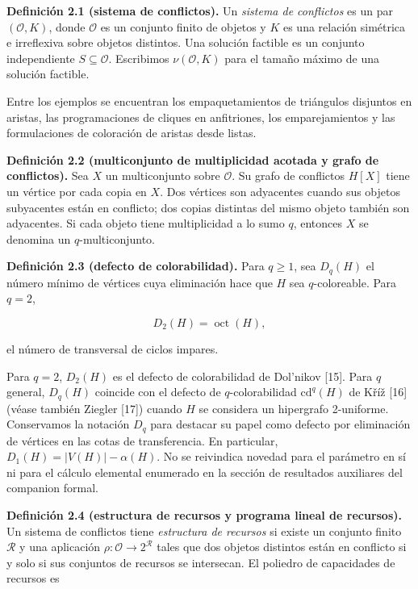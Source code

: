 \documentclass[spanish,11pt,a4paper]{article}
\begin{document}
\textbf{Definición 2.1 (sistema de conflictos).} Un \emph{sistema de
conflictos} es un par \((\mathcal O,K)\), donde \(\mathcal O\) es un
conjunto finito de objetos y \(K\) es una relación simétrica e
irreflexiva sobre objetos distintos. Una solución factible es un
conjunto independiente \(S\subseteq\mathcal O\). Escribimos
\(\nu(\mathcal O,K)\) para el tamaño máximo de una solución factible.

Entre los ejemplos se encuentran los empaquetamientos de triángulos
disjuntos en aristas, las programaciones de cliques en anfitriones, los
emparejamientos y las formulaciones de coloración de aristas desde
listas.

\textbf{Definición 2.2 (multiconjunto de multiplicidad acotada y grafo
de conflictos).} Sea \(X\) un multiconjunto sobre \(\mathcal O\). Su
grafo de conflictos \(H[X]\) tiene un vértice por cada copia en \(X\).
Dos vértices son adyacentes cuando sus objetos subyacentes están en
conflicto; dos copias distintas del mismo objeto también son adyacentes.
Si cada objeto tiene multiplicidad a lo sumo \(q\), entonces \(X\) se
denomina un \(q\)-multiconjunto.

\textbf{Definición 2.3 (defecto de colorabilidad).} Para \(q\ge1\), sea
\(D_q(H)\) el número mínimo de vértices cuya eliminación hace que \(H\)
sea \(q\)-coloreable. Para \(q=2\),

\[
D_2(H)=\operatorname{oct}(H),
\]

el número de transversal de ciclos impares.

Para \(q=2\), \(D_2(H)\) es el defecto de colorabilidad de Dol'nikov
{[}15{]}. Para \(q\) general, \(D_q(H)\) coincide con el defecto de
\(q\)-colorabilidad \(\mathrm{cd}^q(H)\) de Kříž {[}16{]} (véase también
Ziegler {[}17{]}) cuando \(H\) se considera un hipergrafo 2-uniforme.
Conservamos la notación \(D_q\) para destacar su papel como defecto por
eliminación de vértices en las cotas de transferencia. En particular,
\(D_1(H)=|V(H)|-\alpha(H)\). No se reivindica novedad para el parámetro
en sí ni para el cálculo elemental enumerado en la sección de resultados
auxiliares del companion formal.

\textbf{Definición 2.4 (estructura de recursos y programa lineal de
recursos).} Un sistema de conflictos tiene \emph{estructura de recursos}
si existe un conjunto finito \(\mathcal R\) y una aplicación
\(\rho:\mathcal O\to 2^{\mathcal R}\) tales que dos objetos distintos
están en conflicto si y solo si sus conjuntos de recursos se intersecan.
El poliedro de capacidades de recursos es
\end{document}
